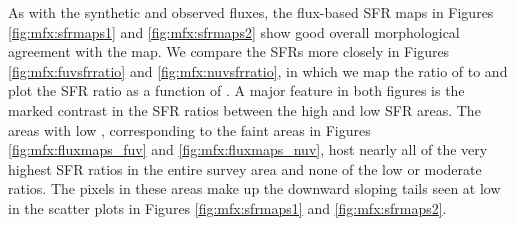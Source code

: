 As with the synthetic and observed fluxes, the flux-based SFR maps in Figures
\ref{fig:mfx:sfrmaps1} and \ref{fig:mfx:sfrmaps2} show good overall
morphological agreement with the \sfroneh{} map. We compare the SFRs more
closely in Figures \ref{fig:mfx:fuvsfrratio} and \ref{fig:mfx:nuvsfrratio}, in
which we map the ratio of \sfrx{} to \sfroneh{} and plot the SFR ratio as a
function of \sfroneh{}. A major feature in both figures is the marked contrast
in the SFR ratios between the high and low SFR areas. The areas with low
\sfroneh{}, corresponding to the faint areas in Figures
\ref{fig:mfx:fluxmaps_fuv} and \ref{fig:mfx:fluxmaps_nuv}, host nearly all of
the very highest SFR ratios in the entire survey area and none of the low or
moderate ratios. The pixels in these areas make up the downward sloping tails
seen at low \sfroneh{} in the scatter plots in Figures \ref{fig:mfx:sfrmaps1}
and \ref{fig:mfx:sfrmaps2}.


